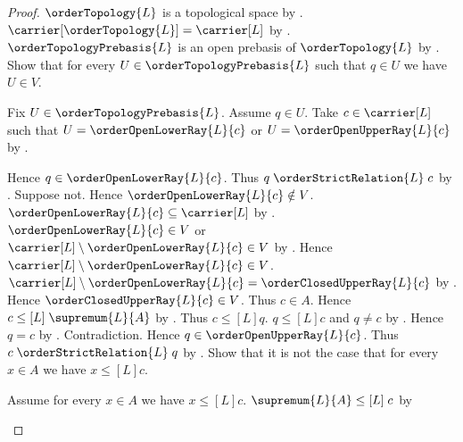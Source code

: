 \begin{proof}
    $\orderTopology{L}$ is a topological space by
        .
    $\carrier[\orderTopology{L}]=\carrier[L]$ by
        .
    $\orderTopologyPrebasis{L}$ is an open prebasis of
        $\orderTopology{L}$ by
        .
    Show that for every $U\in\orderTopologyPrebasis{L}$ such that
        $q\in U$ we have $U\in V$.
    \begin{subproof}
        Fix $U\in\orderTopologyPrebasis{L}$.
        Assume $q\in U$.
        Take $c\in\carrier[L]$ such that
            $U=\orderOpenLowerRay{L}{c}$ or
            $U=\orderOpenUpperRay{L}{c}$ by
            .
        \begin{byCase}
            Hence $q\in\orderOpenLowerRay{L}{c}$.
            Thus $q\mathrel{\orderStrictRelation{L}}c$ by
                .
            Suppose not.
            Hence $\orderOpenLowerRay{L}{c}\notin V$.
            $\orderOpenLowerRay{L}{c}\subseteq\carrier[L]$ by
                .
            $\orderOpenLowerRay{L}{c}\in V$ or
                $\carrier[L]\setminus
                    \orderOpenLowerRay{L}{c}\in V$ by
                .
            Hence $\carrier[L]\setminus
                \orderOpenLowerRay{L}{c}\in V$.
            $\carrier[L]\setminus\orderOpenLowerRay{L}{c}
                =\orderClosedUpperRay{L}{c}$ by
                .
            Hence $\orderClosedUpperRay{L}{c}\in V$.
            Thus $c\in A$.
            Hence $c\mathrel{\leq[L]}\supremum{L}{A}$ by
                .
            Thus $c\mathrel{\leq[L]}q$.
            $q\mathrel{\leq[L]}c$ and $q\neq c$ by
                .
            Hence $q=c$ by
                .
            Contradiction.
            Hence $q\in\orderOpenUpperRay{L}{c}$.
            Thus $c\mathrel{\orderStrictRelation{L}}q$ by
                .
            Show that it is not the case that for every $x\in A$ we have
                $x\mathrel{\leq[L]}c$.
            \begin{subproof}
                Assume for every $x\in A$ we have
                    $x\mathrel{\leq[L]}c$.
                $\supremum{L}{A}\mathrel{\leq[L]}c$ by

\end{subproof}
\end{byCase}
\end{subproof}
\end{proof}
